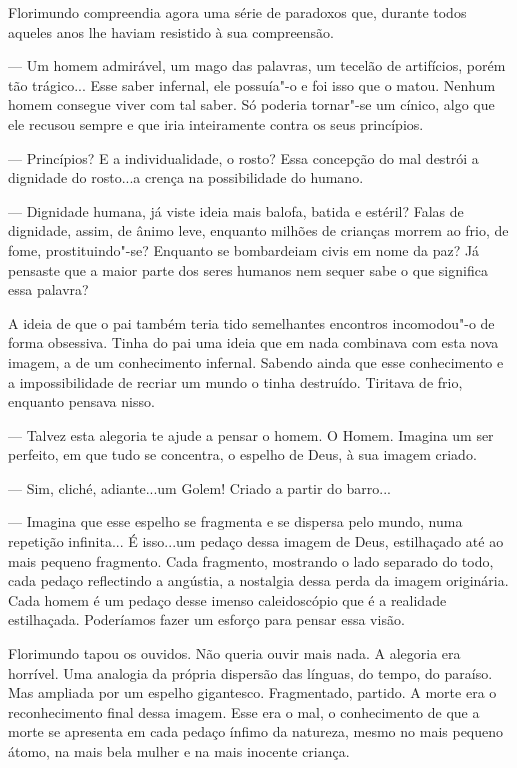 Florimundo compreendia agora uma série de paradoxos que, durante todos
aqueles anos lhe haviam resistido à sua compreensão.

--- Um homem admirável, um mago das palavras, um tecelão de artifícios,
porém tão trágico... Esse saber infernal, ele possuía"-o e foi isso que o
matou. Nenhum homem consegue viver com tal saber. Só poderia tornar"-se
um cínico, algo que ele recusou sempre e que iria inteiramente contra os
seus princípios.

--- Princípios? E a individualidade, o rosto? Essa concepção do mal
destrói a dignidade do rosto...a crença na possibilidade do humano.

--- Dignidade humana, já viste ideia mais balofa, batida e estéril? Falas
de dignidade, assim, de ânimo leve, enquanto milhões de crianças morrem
ao frio, de fome, prostituindo"-se? Enquanto se bombardeiam civis em nome
da paz? Já pensaste que a maior parte dos seres humanos nem sequer sabe
o que significa essa palavra?

A ideia de que o pai também teria tido semelhantes encontros incomodou"-o
de forma obsessiva. Tinha do pai uma ideia que em nada combinava com
esta nova imagem, a de um conhecimento infernal. Sabendo ainda que esse
conhecimento e a impossibilidade de recriar um mundo o tinha destruído.
Tiritava de frio, enquanto pensava nisso.

--- Talvez esta alegoria te ajude a pensar o homem. O Homem. Imagina um
ser perfeito, em que tudo se concentra, o espelho de Deus, à sua imagem
criado.

--- Sim, cliché, adiante...um Golem! Criado a partir do barro...

--- Imagina que esse espelho se fragmenta e se dispersa pelo mundo, numa
repetição infinita... É isso...um pedaço dessa imagem de Deus,
estilhaçado até ao mais pequeno fragmento. Cada fragmento, mostrando o
lado separado do todo, cada pedaço reflectindo a angústia, a nostalgia
dessa perda da imagem originária. Cada homem é um pedaço desse imenso
caleidoscópio que é a realidade estilhaçada. Poderíamos fazer um esforço
para pensar essa visão.

Florimundo tapou os ouvidos. Não queria ouvir mais nada. A alegoria era
horrível. Uma analogia da própria dispersão das línguas, do tempo, do
paraíso. Mas ampliada por um espelho gigantesco. Fragmentado, partido. A
morte era o reconhecimento final dessa imagem. Esse era o mal, o
conhecimento de que a morte se apresenta em cada pedaço ínfimo da
natureza, mesmo no mais pequeno átomo, na mais bela mulher e na mais
inocente criança.

